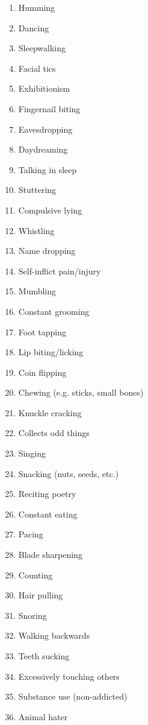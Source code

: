 \documentclass[12pt]{book}
\begin{document}
\begin{multicols}{2} %
    \begin{enumerate}
        \item Humming
        \item Dancing
        \item Sleepwalking
        \item Facial tics
        \item Exhibitionism
        \item Fingernail biting
        \item Eavesdropping
        \item Daydreaming
        \item Talking in sleep
        \item Stuttering
        \item Compulsive lying
        \item Whistling
        \item Name dropping
        \item Self-inflict pain/injury
        \item Mumbling
        \item Constant grooming
        \item Foot tapping
        \item Lip biting/licking
        \item Coin flipping
        \item Chewing (e.g. sticks, small bones)
        \item Knuckle cracking
        \item Collects odd things
        \item Singing
        \item Snacking (nuts, seeds, etc.)
        \item Reciting poetry
        \item Constant eating
        \item Pacing
        \item Blade sharpening
        \item Counting
        \item Hair pulling
        \item Snoring
        \item Walking backwards
        \item Teeth sucking
        \item Excessively touching others
        \item Substance use (non-addicted)
        \item Animal hater

\end{enumerate}
\end{multicols}
\end{document}
